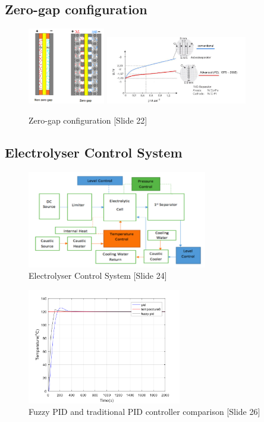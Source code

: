 \subsection{Zero-gap configuration}
\begin{figure}[H]
\includegraphics[width=0.30\textwidth]{zerogap.png}
\includegraphics[width=0.55\textwidth]{zerogapgap.png}
\caption{Zero-gap configuration [Slide 22]} 
\end{figure} 

\subsection{Electrolyser Control System}
\begin{figure}[H]
\centering
\includegraphics[width=0.70\textwidth]{controlcontrol.png}
\caption{Electrolyser Control System [Slide 24]} 
\end{figure}

\begin{figure}[H]
\centering
\includegraphics[width=0.60\textwidth]{pidpid.png}
\caption{Fuzzy PID and traditional PID controller comparison [Slide 26]} 
\end{figure} 






